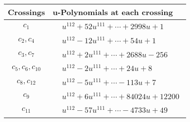 \documentclass[1p]{elsarticle_modified}
\theoremstyle{definition}
\begin{document}
\begin{tabular}{m{50pt}|m{274pt}}
Crossings & \hspace{64pt}u-Polynomials at each crossing \\
\hline $$\begin{aligned}c_{1}\end{aligned}$$&$\begin{aligned}
&u^{112}+52 u^{111}+\cdots+2998 u+1
\end{aligned}$\\
\hline $$\begin{aligned}c_{2},c_{4}\end{aligned}$$&$\begin{aligned}
&u^{112}-12 u^{111}+\cdots+54 u+1
\end{aligned}$\\
\hline $$\begin{aligned}c_{3},c_{7}\end{aligned}$$&$\begin{aligned}
&u^{112}+2 u^{111}+\cdots+2688 u-256
\end{aligned}$\\
\hline $$\begin{aligned}c_{5},c_{6},c_{10}\end{aligned}$$&$\begin{aligned}
&u^{112}-2 u^{111}+\cdots+24 u+8
\end{aligned}$\\
\hline $$\begin{aligned}c_{8},c_{12}\end{aligned}$$&$\begin{aligned}
&u^{112}-5 u^{111}+\cdots-113 u+7
\end{aligned}$\\
\hline $$\begin{aligned}c_{9}\end{aligned}$$&$\begin{aligned}
&u^{112}+6 u^{111}+\cdots+84024 u+12200
\end{aligned}$\\
\hline $$\begin{aligned}c_{11}\end{aligned}$$&$\begin{aligned}
&u^{112}-57 u^{111}+\cdots-4733 u+49
\end{aligned}$\\
\hline
\end{tabular}\\~\\
\newpage\renewcommand{\arraystretch}{1}
\end{document}
